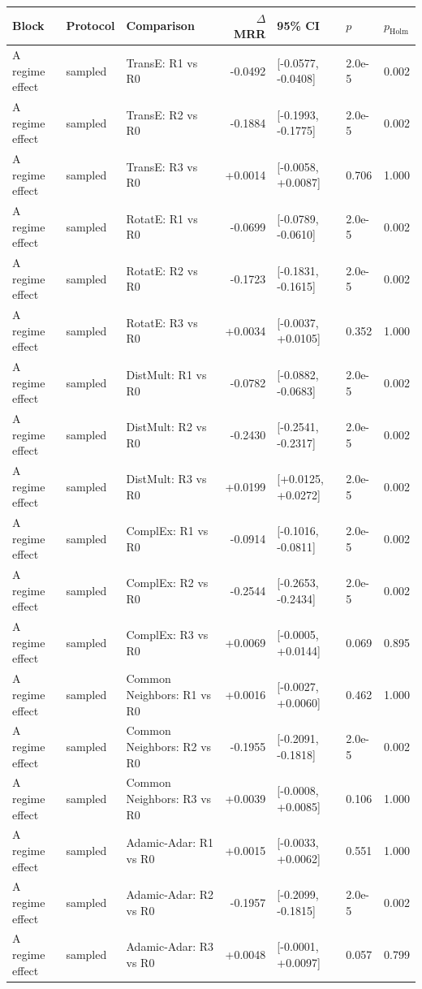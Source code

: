 \begin{tabular}{lllrlll}
\hline
Block & Protocol & Comparison & $\Delta$MRR & 95\% CI & $p$ & $p_{\mathrm{Holm}}$ \\
\hline
A regime effect & sampled & TransE: R1 vs R0 & -0.0492 & [-0.0577, -0.0408] & 2.0e-5 & 0.002 \\
A regime effect & sampled & TransE: R2 vs R0 & -0.1884 & [-0.1993, -0.1775] & 2.0e-5 & 0.002 \\
A regime effect & sampled & TransE: R3 vs R0 & +0.0014 & [-0.0058, +0.0087] & 0.706 & 1.000 \\
A regime effect & sampled & RotatE: R1 vs R0 & -0.0699 & [-0.0789, -0.0610] & 2.0e-5 & 0.002 \\
A regime effect & sampled & RotatE: R2 vs R0 & -0.1723 & [-0.1831, -0.1615] & 2.0e-5 & 0.002 \\
A regime effect & sampled & RotatE: R3 vs R0 & +0.0034 & [-0.0037, +0.0105] & 0.352 & 1.000 \\
A regime effect & sampled & DistMult: R1 vs R0 & -0.0782 & [-0.0882, -0.0683] & 2.0e-5 & 0.002 \\
A regime effect & sampled & DistMult: R2 vs R0 & -0.2430 & [-0.2541, -0.2317] & 2.0e-5 & 0.002 \\
A regime effect & sampled & DistMult: R3 vs R0 & +0.0199 & [+0.0125, +0.0272] & 2.0e-5 & 0.002 \\
A regime effect & sampled & ComplEx: R1 vs R0 & -0.0914 & [-0.1016, -0.0811] & 2.0e-5 & 0.002 \\
A regime effect & sampled & ComplEx: R2 vs R0 & -0.2544 & [-0.2653, -0.2434] & 2.0e-5 & 0.002 \\
A regime effect & sampled & ComplEx: R3 vs R0 & +0.0069 & [-0.0005, +0.0144] & 0.069 & 0.895 \\
A regime effect & sampled & Common Neighbors: R1 vs R0 & +0.0016 & [-0.0027, +0.0060] & 0.462 & 1.000 \\
A regime effect & sampled & Common Neighbors: R2 vs R0 & -0.1955 & [-0.2091, -0.1818] & 2.0e-5 & 0.002 \\
A regime effect & sampled & Common Neighbors: R3 vs R0 & +0.0039 & [-0.0008, +0.0085] & 0.106 & 1.000 \\
A regime effect & sampled & Adamic-Adar: R1 vs R0 & +0.0015 & [-0.0033, +0.0062] & 0.551 & 1.000 \\
A regime effect & sampled & Adamic-Adar: R2 vs R0 & -0.1957 & [-0.2099, -0.1815] & 2.0e-5 & 0.002 \\
A regime effect & sampled & Adamic-Adar: R3 vs R0 & +0.0048 & [-0.0001, +0.0097] & 0.057 & 0.799 \\

\end{tabular}
